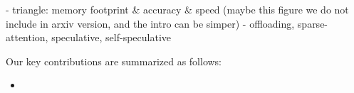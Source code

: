 - triangle: memory footprint \& accuracy \& speed (maybe this figure we do not include in arxiv version, and the intro can be simper)
- offloading, sparse-attention, speculative, self-speculative












Our key contributions are summarized as follows:
%
\begin{itemize}
\item 
\end{itemize}
